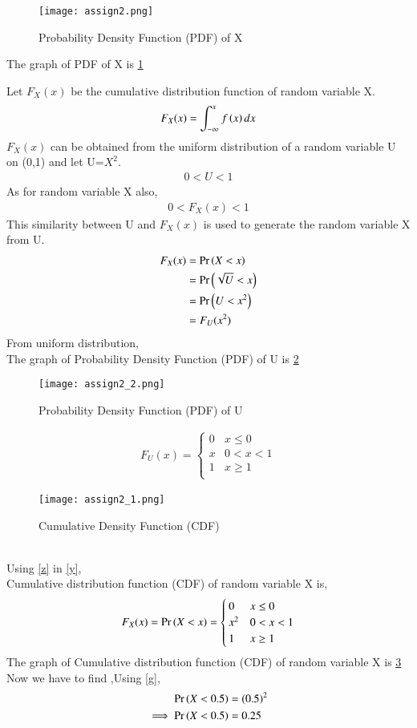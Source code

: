 \documentclass[journal,12pt,twocolumn]{IEEEtran}
\begin{document}
\begin{figure}[ht]
    \centering
    \texttt{[image: assign2.png]}
    \caption{Probability Density Function (PDF) of X}
    \label{Figure_1}
\end{figure}
The graph of PDF of X is \ref{Figure_1}
\par Let $F_X(x)$ be the cumulative distribution function of random variable X.
\begin{align}
    F_X(x)=\int_{-\infty}^x f\left(x\right) dx\label{x}
\end{align}
$F_X(x)$ can be obtained from the uniform distribution of a random variable U on (0,1) and let U=$X^2$. 
\begin{align}
    0 < U < 1
\end{align}
As for random variable X also,
\begin{align}
    0 < F_X(x) < 1
\end{align}
This similarity between U and $F_X(x)$ is used to generate the random variable X from U.
\begin{align}
    F_X(x)&= \Pr\left(X<x\right)\\
    &=\Pr\left(\sqrt{U}<x\right)\\
    &=\Pr\left(U<x^2\right)\\
    &=F_U(x^2)\label{y}
\end{align}
From uniform distribution,
\\The graph of Probability Density Function (PDF) of U is \ref{Figure_2}
\begin{figure}[ht]
    \centering
    \texttt{[image: assign2\_2.png]}
    \caption{Probability Density Function (PDF) of U}
    \label{Figure_2}
\end{figure}
\begin{align}
    F_U(x)=
    \begin{cases}
0 & x\leq0\\
x & 0<x<1
\\
1 & x\geq1\label{z}\\
\end{cases}
\end{align}
\begin{figure}[ht]
    \centering
    \texttt{[image: assign2\_1.png]}
    \caption{Cumulative Density Function (CDF)}
    \label{Figure_3}
\end{figure}
\\Using \eqref{z} in \eqref{y},
\\Cumulative distribution function (CDF) of random variable X is,
\begin{align}
F_X(x)= \Pr\left(X<x\right)
= 
\begin{cases}
0 & x\leq0\\
x^2 & 0<x<1
\\
1 & x\geq1\label{g}\\
\end{cases}
\end{align}
The graph of Cumulative distribution function (CDF) of random variable X is \ref{Figure_3}\\
Now we have to find ,Using  \eqref{g},
\begin{align}
    \Pr\left(X<0.5\right) &= (0.5)^2\\
  \implies \Pr\left(X<0.5\right) &= 0.25
\end{align}
\end{document}
